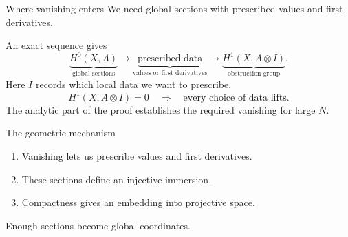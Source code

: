 \begin{frame}{Where vanishing enters}
We need global sections with prescribed values and first derivatives.
\par\bigskip
An exact sequence gives
\[
\underbrace{H^0(X,A)}_{\text{global sections}}
\longrightarrow
\underbrace{\text{prescribed data}}_{\text{values or first derivatives}}
\longrightarrow
\underbrace{H^1(X,A\otimes I)}_{\text{obstruction group}}.
\]
Here \(I\) records which local data we want to prescribe.
\[
\boxed{H^1(X,A\otimes I)=0\quad\Longrightarrow\quad
\text{every choice of data lifts}.}
\]
The analytic part of the proof establishes the required vanishing for large \(N\).
\end{frame}

\begin{frame}{The geometric mechanism}
\begin{enumerate}
\setlength{\itemsep}{14pt}
\item Vanishing lets us prescribe values and first derivatives.
\item These sections define an injective immersion.
\item Compactness gives an embedding into projective space.
\end{enumerate}
\par\bigskip
\centering\large Enough sections become global coordinates.
\end{frame}

